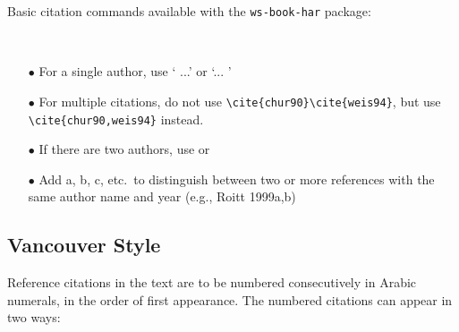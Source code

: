 Basic citation commands available with the \verb|ws-book-har| package:

\


\begin{itemize}
\item[$\bullet$] For a single author, use `\citet{weis94} ...' or
`... \cite{weis94}'
\item[$\bullet$] For multiple citations, do not use \verb|\cite{chur90}\cite{weis94}|, but use
\verb|\cite{chur90,weis94}| instead.
\item[$\bullet$] If there are two authors, use \cite{chur90} or \citep{chur90}
\item[$\bullet$] Add a, b, c, etc.~to distinguish between two or
more references with the same author name and year (e.g., Roitt
1999a,b)
\end{itemize}

\subsection{Vancouver Style}

Reference citations in the text are to be numbered consecutively in
Arabic numerals, in the order of first appearance. The numbered citations
can appear in two ways:

